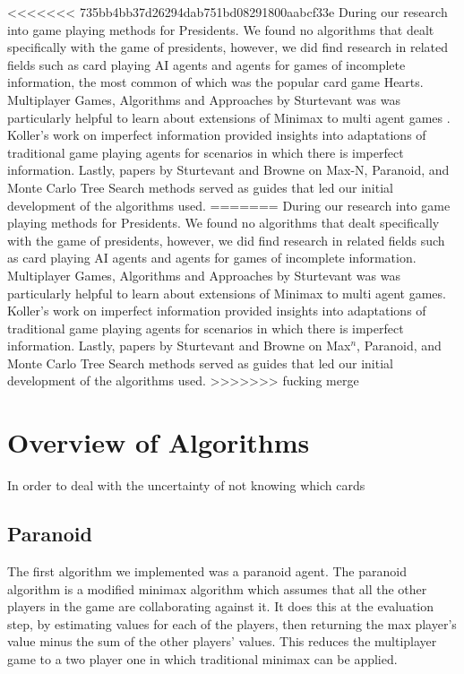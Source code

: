\documentclass[11pt]{article}
\begin{document}
<<<<<<< 735bb4bb37d26294dab751bd08291800aabcf33e
During our research into game playing methods for Presidents. We found no algorithms that dealt specifically with the game of presidents, however, we did find research in related fields such as card playing AI agents and agents for games of incomplete information, the most common of which was the popular card game Hearts.  Multiplayer Games, Algorithms and Approaches by Sturtevant was was particularly helpful to learn about extensions of Minimax to multi agent games \cite{sturtevant03b}. Koller's work on imperfect information provided insights into adaptations of traditional game playing agents for scenarios in which there is imperfect information\cite{pfeffer95}. Lastly, papers by Sturtevant and Browne on Max-N, Paranoid, and Monte Carlo Tree Search methods served as guides that led our initial development of the algorithms used\cite{sturtevant03a, browne12}.
=======
During our research into game playing methods for Presidents. We found no algorithms that dealt specifically with the game of presidents, however, we did find research in related fields such as card playing AI agents and agents for games of incomplete information.  Multiplayer Games, Algorithms and Approaches by Sturtevant was was particularly helpful to learn about extensions of Minimax to multi agent games. Koller's work on imperfect information provided insights into adaptations of traditional game playing agents for scenarios in which there is imperfect information. Lastly, papers by Sturtevant and Browne on Max$^n$, Paranoid, and Monte Carlo Tree Search methods served as guides that led our initial development of the algorithms used.
>>>>>>> fucking merge


\section{Overview of Algorithms}

In order to deal with the uncertainty of not knowing which cards 

\subsection{Paranoid}

The first algorithm we implemented was a paranoid agent. The paranoid algorithm is a modified minimax algorithm which assumes that all the other players in the game are collaborating against it. It does this at the evaluation step, by estimating values for each of the players, then returning the max player's value minus the sum of the other players' values. This reduces the multiplayer game to a two player one in which traditional minimax can be applied.
\end{document}
